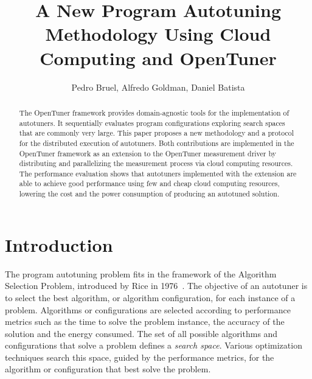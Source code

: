 \documentclass[12pt]{article}
\title{A New Program Autotuning Methodology Using Cloud Computing and OpenTuner}
\author{Pedro Bruel, Alfredo Goldman, Daniel Batista}
\begin{document}
\maketitle

\begin{abstract}



The OpenTuner framework provides domain-agnostic tools for the implementation of autotuners. It sequentially evaluates program configurations exploring search spaces that are commonly very large. This paper proposes a new methodology and a protocol for the distributed execution of autotuners. Both contributions are implemented in the OpenTuner framework as an extension to the OpenTuner measurement driver by distributing and parallelizing the measurement process via cloud computing resources. The performance evaluation shows that autotuners implemented with the extension are able to achieve good performance using few and cheap cloud computing resources, lowering the cost and the power consumption of producing an autotuned solution.

\end{abstract}

\section{Introduction} \label{sec:intro}


The program autotuning problem fits in the framework of the Algorithm Selection
Problem, introduced by Rice in 1976~\cite{rice1976algorithm}. The objective of
an autotuner is to select the best algorithm, or algorithm configuration, for
each instance of a problem.  Algorithms or configurations are selected
according to performance metrics such as the time to solve the problem
instance, the accuracy of the solution and the energy consumed.  The set of all
possible algorithms and configurations that solve a problem defines a
\emph{search space}. Various optimization techniques search this space, guided
by the performance metrics, for the algorithm or configuration that best solve
the problem.
\end{document}

